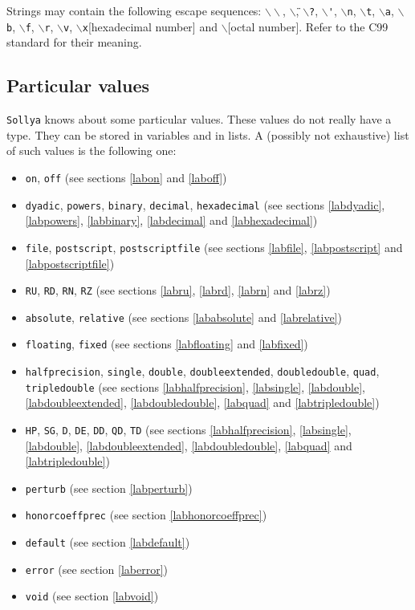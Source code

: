 \documentclass[a4paper]{article}
\newcommand{\com}[1]{\texttt{#1}}
\newcommand{\sollya}{\texttt{Sollya}\xspace}
\begin{document}


Strings may contain the following escape sequences:
\texttt{$\backslash\backslash$}, \texttt{$\backslash$\"},
\texttt{$\backslash$?}, \texttt{$\backslash$\'},
\texttt{$\backslash$n}, \texttt{$\backslash$t},
\texttt{$\backslash$a}, \texttt{$\backslash$b},
\texttt{$\backslash$f}, \texttt{$\backslash$r},
\texttt{$\backslash$v}, \texttt{$\backslash$x}[hexadecimal number] and
\texttt{$\backslash$}[octal number]. Refer to the C99 standard for their
meaning.

\subsection{Particular values}
\sollya knows about some particular values. These values do not really have a type. They can be stored in variables and in lists. A (possibly not exhaustive) list of such values is the following one:

\begin{itemize}
\item \com{on}, \com{off} (see sections \ref{labon} and \ref{laboff})
\item \com{dyadic}, \com{powers}, \com{binary}, \com{decimal}, \com{hexadecimal} (see sections \ref{labdyadic}, \ref{labpowers}, \ref{labbinary}, \ref{labdecimal} and \ref{labhexadecimal})
\item \com{file}, \com{postscript}, \com{postscriptfile} (see sections \ref{labfile}, \ref{labpostscript} and \ref{labpostscriptfile})
\item \com{RU}, \com{RD}, \com{RN}, \com{RZ} (see sections \ref{labru}, \ref{labrd}, \ref{labrn} and \ref{labrz})
\item \com{absolute}, \com{relative} (see sections \ref{lababsolute} and \ref{labrelative})
\item \com{floating}, \com{fixed} (see sections \ref{labfloating} and \ref{labfixed})
\item \com{halfprecision}, \com{single}, \com{double}, \com{doubleextended}, \com{doubledouble}, \com{quad}, \com{tripledouble} (see sections \ref{labhalfprecision}, \ref{labsingle}, \ref{labdouble}, \ref{labdoubleextended}, \ref{labdoubledouble}, \ref{labquad} and \ref{labtripledouble})
\item \com{HP}, \com{SG}, \com{D}, \com{DE}, \com{DD}, \com{QD}, \com{TD} (see sections \ref{labhalfprecision}, \ref{labsingle}, \ref{labdouble}, \ref{labdoubleextended}, \ref{labdoubledouble}, \ref{labquad} and \ref{labtripledouble})
\item \com{perturb} (see section \ref{labperturb})
\item \com{honorcoeffprec} (see section \ref{labhonorcoeffprec})
\item \com{default} (see section \ref{labdefault})
\item \com{error} (see section \ref{laberror})
\item \com{void} (see section \ref{labvoid})
\end{itemize}
\end{document}
